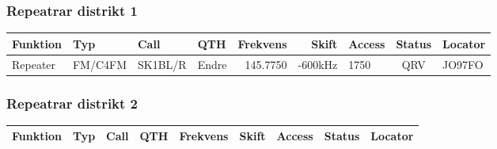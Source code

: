 \begin{landscape}
\clearpage

\subsubsection{Repeatrar distrikt 1}
\footnotesize
\begin{longtable}{llllrrlcl}
\textbf{Funktion} & \textbf{Typ} & \textbf{Call} & \textbf{QTH} & \textbf{Frekvens} & \textbf{Skift} & \textbf{Access} & \textbf{Status} & \textbf{Locator} \\ \hline \endhead
Repeater          & FM/C4FM      & SK1BL/R       & Endre	& 145.7750          & -600kHz        & 1750            & QRV             & JO97FO           \\
\end{longtable}
\normalsize

\subsubsection{Repeatrar distrikt 2}
\footnotesize
\begin{longtable}{llllrrlcl}
\textbf{Funktion}                 & \textbf{Typ}  & \textbf{Call} & \textbf{QTH}        & \textbf{Frekvens} & \textbf{Skift} & \textbf{Access}  & \textbf{Status} & \textbf{Locator} \\ \hline \endhead


\end{longtable}
\end{landscape}
